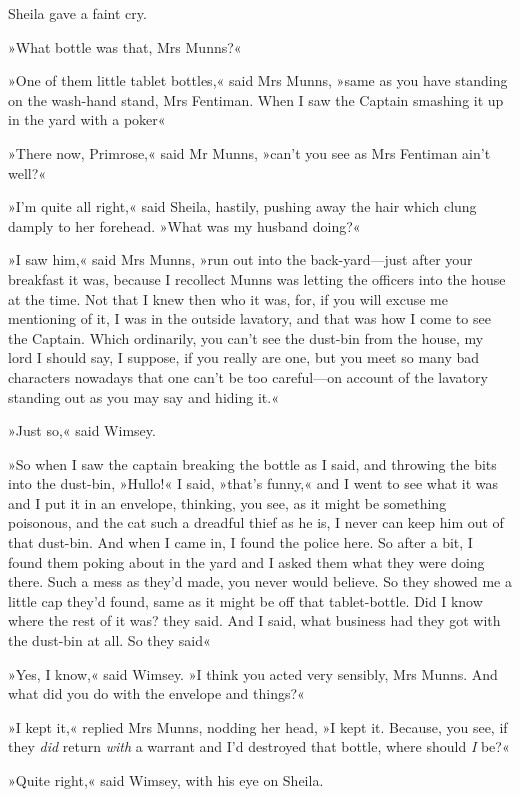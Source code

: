 Sheila gave a faint cry.

»What bottle was that, Mrs Munns?«

»One of them little tablet bottles,« said Mrs Munns, »same as you have standing on the wash-hand stand, Mrs Fentiman. When I saw the Captain smashing it up in the yard with a poker\longdash«

»There now, Primrose,« said Mr Munns, »can't you see as Mrs Fentiman ain't well?«

»I'm quite all right,« said Sheila, hastily, pushing away the hair which clung damply to her forehead. »What was my husband doing?«

»I saw him,« said Mrs Munns, »run out into the back-yard—just after your breakfast it was, because I recollect Munns was letting the officers into the house at the time. Not that I knew then who it was, for, if you will excuse me mentioning of it, I was in the outside lavatory, and that was how I come to see the Captain. Which ordinarily, you can't see the dust-bin from the house, my lord I should say, I suppose, if you really are one, but you meet so many bad characters nowadays that one can't be too careful—on account of the lavatory standing out as you may say and hiding it.«

»Just so,« said Wimsey.

»So when I saw the captain breaking the bottle as I said, and throwing the bits into the dust-bin, »Hullo!« I said, »that's funny,« and I went to see what it was and I put it in an envelope, thinking, you see, as it might be something poisonous, and the cat such a dreadful thief as he is, I never can keep him out of that dust-bin. And when I came in, I found the police here. So after a bit, I found them poking about in the yard and I asked them what they were doing there. Such a mess as they'd made, you never would believe. So they showed me a little cap they'd found, same as it might be off that tablet-bottle. Did I know where the rest of it was? they said. And I said, what business had they got with the dust-bin at all. So they said\longdash«

»Yes, I know,« said Wimsey. »I think you acted very sensibly, Mrs Munns. And what did you do with the envelope and things?«

»I kept it,« replied Mrs Munns, nodding her head, »I kept it. Because, you see, if they \textit{did} return \textit{with} a warrant and I'd destroyed that bottle, where should \textit{I} be?«

»Quite right,« said Wimsey, with his eye on Sheila.


